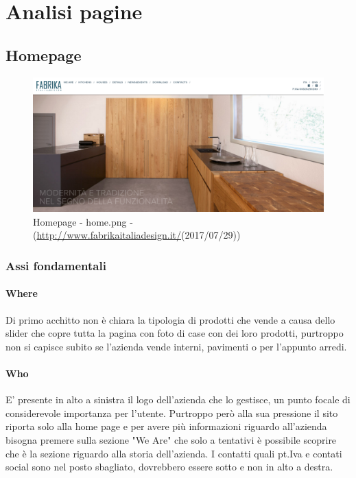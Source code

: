 \documentclass[../Relazione.tex]{subfiles}
\begin{document}
\section{Analisi pagine}
    \subsection{Homepage}
        \begin{figure}[!h]
            \centering
            \includegraphics[width=\textwidth]{img/home.png}
            \caption{Homepage - home.png - (\url{http://www.fabrikaitaliadesign.it/}(2017/07/29))}
        \end{figure}
       
     
        \subsubsection{Assi fondamentali}
            \paragraph{Where}
            Di primo acchitto non è chiara la tipologia di prodotti che vende a causa dello slider che copre tutta la pagina con foto di case con dei loro prodotti, purtroppo non si capisce subito se l'azienda vende interni, pavimenti o per l'appunto arredi.
           

            \paragraph{Who}
            E’ presente in alto a sinistra il logo dell’azienda che lo gestisce, un punto focale di considerevole importanza per l’utente. Purtroppo però alla sua pressione il sito riporta solo alla home page e per avere più informazioni riguardo all'azienda bisogna premere sulla sezione "We Are" che solo a tentativi è possibile scoprire che è la sezione riguardo alla storia dell'azienda.
            I contatti quali pt.Iva e contati social sono nel posto sbagliato, dovrebbero essere sotto e non in alto a destra.
\end{document}

